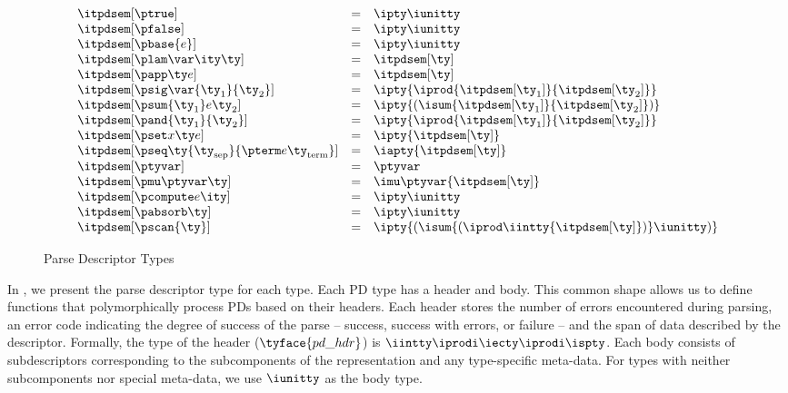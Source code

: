 \begin{figure}
\fbox{$\itpdsem[\ty] = \ity$}
\[ 
\begin{array}{lcl} 
\itpdsem[\ptrue] & = & \ipty \iunitty \\                                                  
\itpdsem[\pfalse] & = & \ipty \iunitty \\                                                  
\itpdsem[\pbase{e}] & = & \ipty \iunitty\\
\itpdsem[\plam \var \ity \ty] & = & \itpdsem[\ty] \\
\itpdsem[\papp \ty e] & = & \itpdsem[\ty] \\
\itpdsem[\psig \var {\ty_1} {\ty_2}] & = & 
               \ipty {\iprod {\itpdsem[\ty_1]} {\itpdsem[\ty_2]}} \\
\itpdsem[\psum {\ty_1} e {\ty_2}] & = & 
               \ipty {(\isum {\itpdsem[\ty_1]} {\itpdsem[\ty_2]})} \\
\itpdsem[\pand {\ty_1} {\ty_2}] & = & \ipty {\iprod {\itpdsem[\ty_1]} {\itpdsem[\ty_2]}}    \\
\itpdsem[\pset x \ty e] & = & \ipty {\itpdsem[\ty]} \\
\itpdsem[\pseq \ty {\ty_{\text{sep}}} {\pterm e {\ty_{\text{term}}}}] & = & 
  \iapty {\itpdsem[\ty]} \\
\itpdsem[\ptyvar] & = & \ptyvar \\
\itpdsem[\pmu \ptyvar \ty] & = & \imu \ptyvar {\itpdsem[\ty]} \\
\itpdsem[\pcompute e \ity]            & = & \ipty \iunitty \\
\itpdsem[\pabsorb \ty]                & = & \ipty \iunitty \\
\itpdsem[\pscan{\ty}] & = & \ipty {(\isum {(\iprod \iintty
    {\itpdsem[\ty]})} \iunitty)}
\end{array}
\]
\caption{Parse Descriptor Types}
\label{fig:pd-tys}
\end{figure}

In , we present the parse descriptor
type for each \ddc{} type. Each PD type has a header and body.
This common shape allows us to define functions that polymorphically
process PDs based on their headers. Each header stores the number of
errors encountered during parsing, an error code indicating the degree
of success of the parse -- success, success with errors, or failure --
and the span of data described by the descriptor.  Formally, the type
of the header  ($\tyface{pd\_hdr}$) is $\iintty \iprodi \iecty \iprodi
\ispty$.  Each body consists of subdescriptors corresponding to the
subcomponents of the representation and any type-specific meta-data. For types with neither subcomponents nor special meta-data, we
use $\iunitty$ as the body type.

